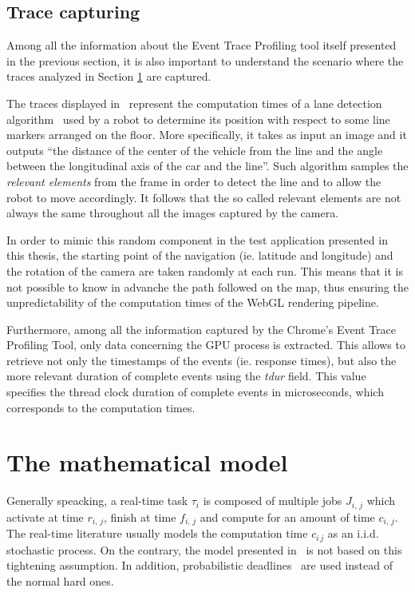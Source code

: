 \subsection{Trace capturing}
Among all the information about the Event Trace Profiling tool itself presented
in the previous section, it is
also important to understand the scenario where the traces analyzed in Section
\ref{sec:math_model} are captured.

The traces displayed in~\cite{frias2017probabilistic} represent the computation
times of a lane detection algorithm~\cite{fontanelli2014vision} used by a robot
to determine its position with respect to some line markers arranged on the floor.
More specifically, it takes as input an image and it outputs ``the distance
of the center of the vehicle from the line and the angle between the longitudinal
axis of the car and the line''. Such algorithm samples the \emph{relevant elements}
from the frame in order to detect the line and to allow the robot to move accordingly.
It follows that the so called relevant elements are not always the same throughout
all the images captured by the camera.

In order to mimic this random component in the test application presented in this
thesis, the starting point of the navigation (ie. latitude and longitude) and
the rotation of the camera are taken randomly at each run.
This means that it is not possible to know in advanche the path followed on the
map, thus ensuring the unpredictability of the computation times of the WebGL
rendering pipeline.

Furthermore, among all the information captured by the
Chrome's Event Trace Profiling Tool, only data concerning the GPU process is
extracted. This allows to retrieve not only the timestamps of the events (ie.
response times), but also the more relevant duration of complete events using
the \emph{tdur} field. This value specifies the thread clock duration of complete
events in microseconds, which corresponds to the computation times.


\section{The mathematical model}\label{sec:math_model}
Generally speacking, a real-time task \(\tau_{i}\) is composed of multiple jobs
\(J_{i,\,j}\) which activate at time \(r_{i,\,j}\), finish at time \(f_{i,\,j}\)
and compute for an amount of time \(c_{i,\,j}\). The real-time literature usually
models the computation time \(c_{i\,j}\) as an i.i.d. stochastic process.
On the contrary, the model presented in~\cite{frias2017probabilistic} is not
based on this tightening assumption. In addition, probabilistic
deadlines~\cite{abeni1999qos} are used instead of the normal hard ones.

